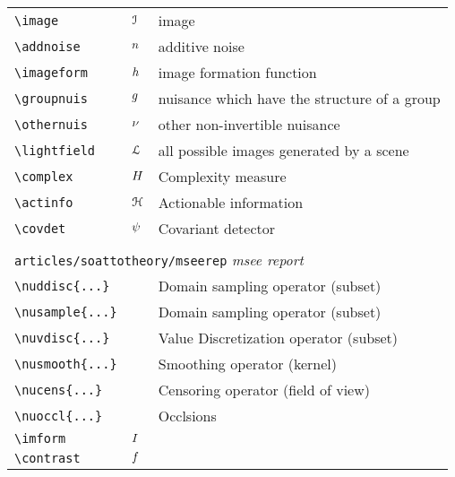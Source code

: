 \begin{longtable}{lll}
 {\color[rgb]{0.5,0.5,0.5}\texttt{\textbackslash image}} & $\mathcal{I}$ &  image\\ 
 {\color[rgb]{0.5,0.5,0.5}\texttt{\textbackslash addnoise}} & $n$ &  additive noise\\ 
 {\color[rgb]{0.5,0.5,0.5}\texttt{\textbackslash imageform}} & $h$ &  image formation function\\ 
 {\color[rgb]{0.5,0.5,0.5}\texttt{\textbackslash groupnuis}} & $g$ &  nuisance which have the structure of a group\\ 
 {\color[rgb]{0.5,0.5,0.5}\texttt{\textbackslash othernuis}} & $\nu$ &  other non-invertible nuisance\\ 
 {\color[rgb]{0.5,0.5,0.5}\texttt{\textbackslash lightfield}} & $\mathcal{L}$ &  all possible images generated by a scene\\ 
 {\color[rgb]{0.5,0.5,0.5}\texttt{\textbackslash complex}} & $H$ &  Complexity measure\\ 
 {\color[rgb]{0.5,0.5,0.5}\texttt{\textbackslash actinfo}} & $\mathcal{H}$ &  Actionable information\\ 
 {\color[rgb]{0.5,0.5,0.5}\texttt{\textbackslash covdet}} & $\psi$ &  Covariant detector\\ 
  &  & \\ 
 \multicolumn{3}{l}{{\color[rgb]{0.5,0.5,0.5}\texttt{articles/soattotheory/mseerep}} \emph{msee report}}\\ 
 \hline
{\color[rgb]{0.5,0.5,0.5}\texttt{\textbackslash nuddisc\{...\}}} &  &  Domain sampling operator (subset)\\ 
 {\color[rgb]{0.5,0.5,0.5}\texttt{\textbackslash nusample\{...\}}} &  &  Domain sampling operator (subset)\\ 
 {\color[rgb]{0.5,0.5,0.5}\texttt{\textbackslash nuvdisc\{...\}}} &  &  Value Discretization operator (subset)\\ 
 {\color[rgb]{0.5,0.5,0.5}\texttt{\textbackslash nusmooth\{...\}}} &  &  Smoothing operator (kernel)\\ 
 {\color[rgb]{0.5,0.5,0.5}\texttt{\textbackslash nucens\{...\}}} &  &  Censoring operator (field of view)\\ 
 {\color[rgb]{0.5,0.5,0.5}\texttt{\textbackslash nuoccl\{...\}}} &  &  Occlsions\\ 
 {\color[rgb]{0.5,0.5,0.5}\texttt{\textbackslash imform}} & $I$ & \\ 
 {\color[rgb]{0.5,0.5,0.5}\texttt{\textbackslash contrast}} & $f$ & \\ 

\end{longtable}
